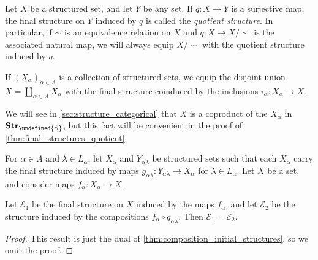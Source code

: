 \documentclass[article, a4paper, 11pt, oneside]{memoir}
\let\mathfrak\undefined
\numberwithin{equation}{chapter}
\newcommand{\calE}{\mathcal{E}}
\newcommand{\strucS}{\mathfrak{S}}
\newcommand{\ncat}[1]{\mathbf{#1}} %
\newcommand{\catStruc}[1]{\ncat{Str}_{#1}} %
\newcommand{\catStrucS}{\catStruc{\strucS}} %
\begin{document}
\begin{examplebreak}
    Let $X$ be a structured set, and let $Y$ be any set. If $q \colon X \to Y$ is a surjective map, the final structure on $Y$ induced by $q$ is called the \emph{quotient structure}. In particular, if $\sim$ is an equivalence relation on $X$ and $q \colon X \to X/{\sim}$ is the associated natural map, we will always equip $X/{\sim}$ with the quotient structure induced by $q$.
\end{examplebreak}


\begin{examplebreak}
    If $(X_\alpha)_{\alpha \in A}$ is a collection of structured sets, we equip the disjoint union $X = \coprod_{\alpha \in A} X_\alpha$ with the final structure coinduced by the inclusions $i_\alpha \colon X_\alpha \to X$.

    We will see in \cref{sec:structure_categorical} that $X$ is a coproduct of the $X_\alpha$ in $\catStrucS$, but this fact will be convenient in the proof of \cref{thm:final_structures_quotient}.
\end{examplebreak}


\begin{proposition}
    \label{thm:composition_final_structures}
    For $\alpha \in A$ and $\lambda \in L_\alpha$, let $X_\alpha$ and $Y_{\alpha\lambda}$ be structured sets such that each $X_\alpha$ carry the final structure induced by maps $g_{\alpha\lambda} \colon Y_{\alpha\lambda} \to X_\alpha$ for $\lambda \in L_\alpha$. Let $X$ be a set, and consider maps $f_\alpha \colon X_\alpha \to X$.

    Let $\calE_1$ be the final structure on $X$ induced by the maps $f_\alpha$, and let $\calE_2$ be the structure induced by the compositions $f_\alpha \circ g_{\alpha\lambda}$. Then $\calE_1 = \calE_2$.
\end{proposition}

\begin{proof}
    This result is just the dual of \cref{thm:composition_initial_structures}, so we omit the proof.
\end{proof}
\end{document}

